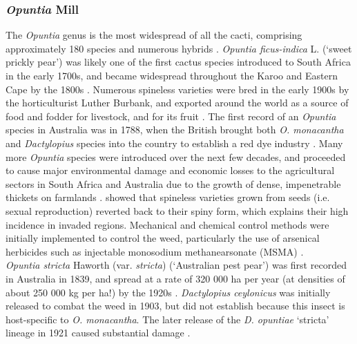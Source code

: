 \subsubsection{\textit{Opuntia} Mill}

The \textit{Opuntia} genus is the most widespread of all the cacti, comprising approximately 180 species and numerous hybrids \citep{Anderson2001, Griffith2003}. \textit{Opuntia ficus-indica} L. (`sweet prickly pear') was likely one of the first cactus species introduced to South Africa in the early 1700s, and became widespread throughout the Karoo and Eastern Cape by the 1800s \citep{Annecke1978, Dean2000}. 
Numerous spineless varieties were bred in the early 1900s by the horticulturist Luther Burbank, and exported around the world as a source of food and fodder for livestock, and for its fruit \citep{anderson2015vast}. The first record of an \textit{Opuntia} species in Australia was in 1788, when the British brought both \textit{O. monacantha} and \textit{Dactylopius} species into the country to establish a red dye industry \citep{mann1970cacti}.
Many more \textit{Opuntia} species were introduced over the next few decades, and proceeded to cause major environmental damage and economic losses to the agricultural sectors in South Africa and Australia due to the growth of dense, impenetrable thickets on farmlands \citep{Dean2000}. \citet{novoa2019spinelessness} showed that spineless varieties grown from seeds (i.e. sexual reproduction) reverted back to their spiny form, which explains their high incidence in invaded regions. 
Mechanical and chemical control methods were initially implemented to control the weed, particularly the use of arsenical herbicides such as injectable monosodium methanearsonate (MSMA) \citep{Annecke1978,Zimmermann1991BiologicalAfrica}. \\ \textit{Opuntia stricta} Haworth (var. \textit{stricta}) (`Australian pest pear') was first recorded in Australia in 1839, and spread at a rate of 320 000 ha per year (at densities of about 250 000 kg per ha!) by the 1920s \citep{raghu2007understanding}. \textit{Dactylopius ceylonicus} was initially released to combat the weed in 1903, but did not establish because this insect is host-specific to \textit{O. monacantha}. The later release of the \textit{D. opuntiae} `stricta' lineage in 1921 caused substantial damage \citep{Winston2014BiologicalWeeds.}.
